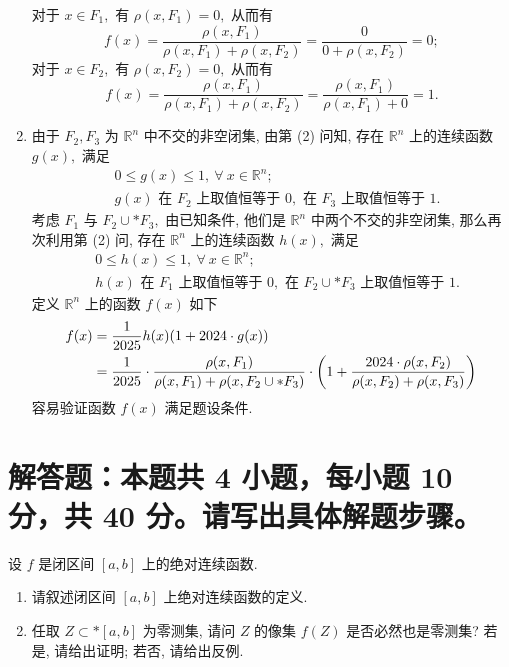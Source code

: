 \begin{solution}
\begin{enumerate}
对于 $x \in F_1,$ 有 $\rho(x, F_1) = 0,$ 从而有
$$f(x) = \dfrac{\rho(x, F_1)}{\rho(x, F_1) + \rho(x, F_2)} = \dfrac{0}{0 + \rho(x, F_2)} = 0;$$
对于 $x \in F_2,$ 有 $\rho(x, F_2) = 0,$ 从而有
$$f(x) = \dfrac{\rho(x, F_1)}{\rho(x, F_1) + \rho(x, F_2)} = \dfrac{\rho(x, F_1)}{\rho(x, F_1) + 0} = 1.$$
\item 由于 $F_2, F_3$ 为 $\mathbb{R}^n$ 中不交的非空闭集, 由第 (2) 问知, 存在 $\mathbb{R}^n$ 上的连续函数 $g(x),$ 满足
\begin{align*}
& 0 \leqslant g(x) \leqslant 1, ~ \forall ~ x \in \mathbb{R}^n; \\
& \text{$g(x)$ 在 $F_2$ 上取值恒等于 $0,$ 在 $F_3$ 上取值恒等于 $1.$}
\end{align*}
考虑 $F_1$ 与 $F_2 \cup* F_3,$ 由已知条件, 他们是 $\mathbb{R}^n$ 中两个不交的非空闭集, 那么再次利用第 (2) 问, 存在 $\mathbb{R}^n$ 上的连续函数 $h(x),$ 满足
\begin{align*}
& 0 \leqslant h(x) \leqslant 1, ~ \forall ~ x \in \mathbb{R}^n; \\
& \text{$h(x)$ 在 $F_1$ 上取值恒等于 $0,$ 在 $F_2 \cup* F_3$ 上取值恒等于 $1.$}
\end{align*}
定义 $\mathbb{R}^n$ 上的函数 $f(x)$ 如下
\begin{align*}
f(x) & = \dfrac{1}{2025} h(x) (1 + 2024 \cdot g(x)) \score{5} \\
& = \dfrac{1}{2025} \cdot \dfrac{\rho(x, F_1)}{\rho(x, F_1) + \rho(x, F_2 \cup* F_3)} \cdot \left( 1 + \dfrac{2024 \cdot \rho(x, F_2)}{\rho(x, F_2) + \rho(x, F_3)} \right)
\end{align*}
容易验证函数 $f(x)$ 满足题设条件.
\end{enumerate}
\end{solution}


\section{解答题：本题共 4 小题，每小题 10 分，共 40 分。请写出具体解题步骤。}


\begin{question}[points = 10]设 $f$ 是闭区间 $[a, b]$ 上的绝对连续函数.
\begin{enumerate}
\item 请叙述闭区间 $[a, b]$ 上绝对连续函数的定义.
\item 任取 $Z \subset* [a, b]$ 为零测集, 请问 $Z$ 的像集 $f(Z)$ 是否必然也是零测集? 若是, 请给出证明; 若否, 请给出反例.
\end{enumerate}

\end{question}

